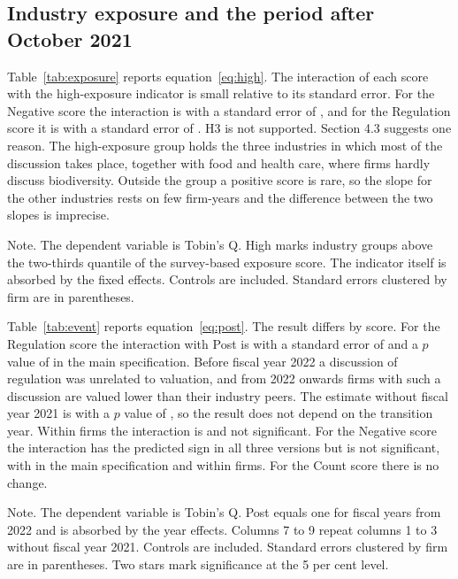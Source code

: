 \documentclass[12pt,a4paper]{article}
\newcommand{\tablenote}[1]{\par\smallskip\begin{minipage}{\linewidth}\footnotesize\setstretch{1.05}#1\end{minipage}}
\newcommand{\widetable}[1]{\resizebox{\ifdim\width>\linewidth\linewidth\else\width\fi}{!}{}}
\begin{document}
\subsection{Industry exposure and the period after October 2021}

Table~\ref{tab:exposure} reports equation~\eqref{eq:high}. The interaction of each score with the high-exposure indicator is small relative to its standard error. For the Negative score the interaction is \coefXNeg{} with a standard error of \seXNeg{}, and for the Regulation score it is \coefXReg{} with a standard error of \seXReg{}. H3 is not supported. Section 4.3 suggests one reason. The high-exposure group holds the three industries in which most of the discussion takes place, together with food and health care, where firms hardly discuss biodiversity. Outside the group a positive score is rare, so the slope for the other industries rests on few firm-years and the difference between the two slopes is imprecise.

\begin{table}[!htbp]
\centering\small
\caption{Biodiversity scores and Tobin's Q in high-exposure industries}\label{tab:exposure}
\widetable{tables/tab_exposure}
\tablenote{Note. The dependent variable is Tobin's Q. High marks industry groups above the two-thirds quantile of the survey-based exposure score. The indicator itself is absorbed by the fixed effects. Controls are included. Standard errors clustered by firm are in parentheses.}
\end{table}

Table~\ref{tab:event} reports equation~\eqref{eq:post}. The result differs by score. For the Regulation score the interaction with Post is \coefEReg{} with a standard error of \seEReg{} and a $p$ value of \pvalEReg{} in the main specification. Before fiscal year 2022 a discussion of regulation was unrelated to valuation, and from 2022 onwards firms with such a discussion are valued lower than their industry peers. The estimate without fiscal year 2021 is \coefEDReg{} with a $p$ value of \pvalEDReg{}, so the result does not depend on the transition year. Within firms the interaction is \coefEFReg{} and not significant. For the Negative score the interaction has the predicted sign in all three versions but is not significant, with \coefENeg{} in the main specification and \coefEFNeg{} within firms. For the Count score there is no change.

\begin{table}[!htbp]
\centering\footnotesize
\caption{Biodiversity scores and Tobin's Q after the Kunming Declaration}\label{tab:event}
\widetable{tables/tab_event}
\tablenote{Note. The dependent variable is Tobin's Q. Post equals one for fiscal years from 2022 and is absorbed by the year effects. Columns 7 to 9 repeat columns 1 to 3 without fiscal year 2021. Controls are included. Standard errors clustered by firm are in parentheses. Two stars mark significance at the 5 per cent level.}
\end{table}
\end{document}
